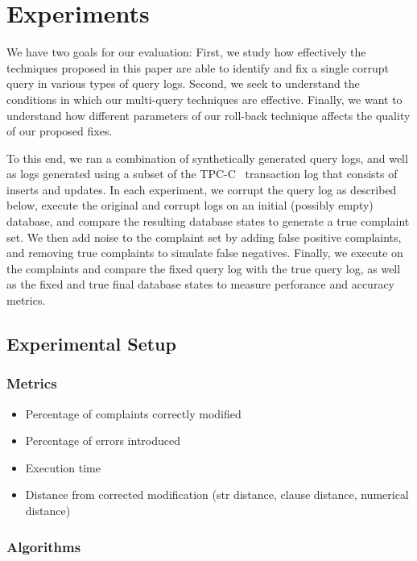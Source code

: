 \section{Experiments}

We have two goals for our evaluation: First, we study how effectively
the techniques proposed in this paper are able to identify and fix
a single corrupt query in various types of query logs.  Second, we
seek to understand the conditions in which our multi-query techniques
are effective.  Finally, we want to understand how different
parameters of our roll-back technique affects the quality of our
proposed fixes.

To this end,
we ran a combination of synthetically generated query logs, and
well as logs generated using a subset of the TPC-C~\cite{tpcc}
transaction log that consists of inserts and updates.  In each
experiment, we corrupt the query log as described below, execute
the original and corrupt logs on an initial (possibly empty) database,
and compare the resulting database states to generate a true complaint
set.  We then add noise to the complaint set by adding false positive
complaints, and removing true complaints to simulate false negatives.
Finally, we execute \sys on the complaints and compare the fixed
query log with the true query log, as well as the fixed and true
final database states to measure perforance and accuracy metrics.


%
%

\subsection{Experimental Setup}

\subsubsection{Metrics}

\begin{itemize}
\item Percentage of complaints correctly modified
\item Percentage of errors introduced
\item Execution time
\item Distance from corrected modification (str distance, clause distance, numerical distance)
\end{itemize}

\subsubsection{Algorithms}

